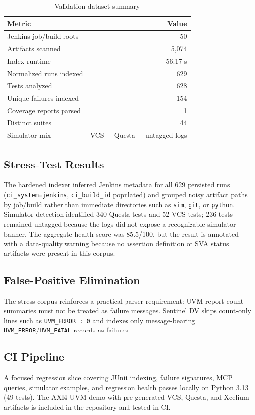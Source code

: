 \documentclass[10pt,twocolumn]{article}
\begin{document}
\begin{table}[h]
\centering
\caption{Validation dataset summary}
\label{tab:dataset}
\small
\begin{tabular}{lr}
\toprule
\textbf{Metric} & \textbf{Value} \\
\midrule
Jenkins job/build roots & 50 \\
Artifacts scanned       & 5,074 \\
Index runtime           & 56.17 s \\
Normalized runs indexed & 629 \\
Tests analyzed          & 628 \\
Unique failures indexed & 154 \\
Coverage reports parsed & 1 \\
Distinct suites         & 44 \\
Simulator mix           & VCS + Questa + untagged logs \\
\bottomrule
\end{tabular}
\end{table}

\subsection{Stress-Test Results}
The hardened indexer inferred Jenkins metadata for all 629 persisted runs
(\texttt{ci\_system=jenkins}, \texttt{ci\_build\_id} populated) and grouped noisy
artifact paths by job/build rather than immediate directories such as
\texttt{sim}, \texttt{git}, or \texttt{python}. Simulator detection identified
340 Questa tests and 52 VCS tests; 236 tests remained untagged because the logs
did not expose a recognizable simulator banner. The aggregate health score was
85.5/100, but the result is annotated with a data-quality warning because no
assertion definition or SVA status artifacts were present in this corpus.

\subsection{False-Positive Elimination}
The stress corpus reinforces a practical parser requirement: UVM report-count
summaries must not be treated as failure messages. Sentinel DV skips count-only
lines such as \texttt{UVM\_ERROR : 0} and indexes only message-bearing
\texttt{UVM\_ERROR}/\texttt{UVM\_FATAL} records as failures.

\subsection{CI Pipeline}
A focused regression slice covering JUnit indexing, failure signatures, MCP
queries, simulator examples, and regression health passes locally on Python
3.13 (49 tests). The AXI4 UVM demo with pre-generated VCS, Questa, and Xcelium
artifacts is included in the repository and tested in CI.
\end{document}
